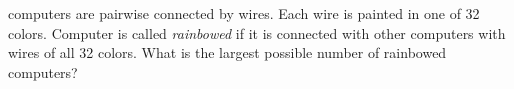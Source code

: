  computers are pairwise connected by wires.
Each wire is painted in one of 32 colors.
Computer is called \emph{rainbowed} if it is connected with other computers
with wires of all 32 colors.
What is the largest possible number of rainbowed computers?
\solution
\endproblem
